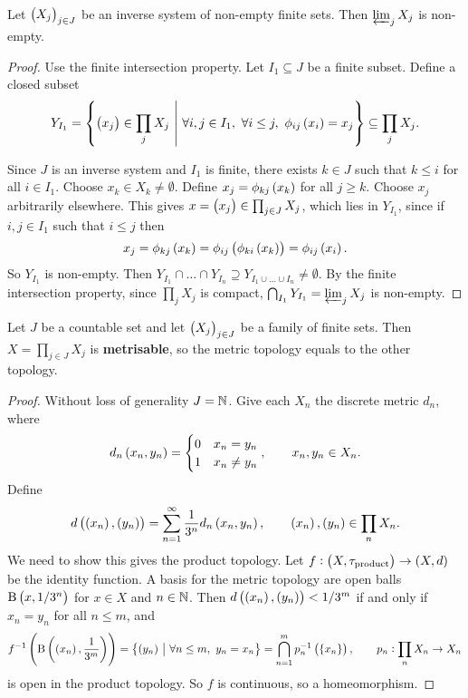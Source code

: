 \begin{proposition}
Let $ \br{X_j}_{j \in J} $ be an inverse system of non-empty finite sets. Then $ \varprojlim_j X_j $ is non-empty.
\end{proposition}

\begin{proof}
Use the finite intersection property. Let $ I_1 \subseteq J $ be a finite subset. Define a closed subset
$$ Y_{I_1} = \cbr{\br{x_j} \in \prod_j X_j \st \forall i, j \in I_1, \ \forall i \le j, \ \phi_{ij}\br{x_i} = x_j} \subseteq \prod_j X_j. $$

\pagebreak

Since $ J $ is an inverse system and $ I_1 $ is finite, there exists $ k \in J $ such that $ k \le i $ for all $ i \in I_1 $. Choose $ x_k \in X_k \ne \emptyset $. Define $ x_j = \phi_{kj}\br{x_k} $ for all $ j \ge k $. Choose $ x_j $ arbitrarily elsewhere. This gives $ x = \br{x_j} \in \prod_{j \in J} X_j $, which lies in $ Y_{I_1} $, since if $ i, j \in I_1 $ such that $ i \le j $ then
$$ x_j = \phi_{kj}\br{x_k} = \phi_{ij}\br{\phi_{ki}\br{x_k}} = \phi_{ij}\br{x_i}. $$
So $ Y_{I_1} $ is non-empty. Then $ Y_{I_1} \cap \dots \cap Y_{I_n} \supseteq Y_{I_1 \cup \dots \cup I_n} \ne \emptyset $. By the finite intersection property, since $ \prod_j X_j $ is compact, $ \bigcap_{I_1} Y_{I_1} = \varprojlim_j X_j $ is non-empty.
\end{proof}

\begin{proposition}
Let $ J $ be a countable set and let $ \br{X_j}_{j \in J} $ be a family of finite sets. Then $ X = \prod_{j \in J} X_j $ is \textbf{metrisable}, so the metric topology equals to the other topology.
\end{proposition}

\begin{proof}
Without loss of generality $ J = \mathbb{N} $. Give each $ X_n $ the discrete metric $ d_n $, where
$$ d_n\br{x_n, y_n} =
\begin{cases}
0 & x_n = y_n \\
1 & x_n \ne y_n
\end{cases},
\qquad x_n, y_n \in X_n. $$
Define
$$ d\br{\br{x_n}, \br{y_n}} = \sum_{n = 1}^\infty \dfrac{1}{3^n}d_n\br{x_n, y_n}, \qquad \br{x_n}, \br{y_n} \in \prod_n X_n. $$
We need to show this gives the product topology. Let $ f : \br{X, \tau_{\text{product}}} \to \br{X, d} $ be the identity function. A basis for the metric topology are open balls $ \B\br{x, 1 / 3^n} $ for $ x \in X $ and $ n \in \mathbb{N} $. Then $ d\br{\br{x_n}, \br{y_n}} < 1 / 3^m $ if and only if $ x_n = y_n $ for all $ n \le m $, and
$$ f^{-1}\br{\B\br{\br{x_n}, \dfrac{1}{3^m}}} = \cbr{\br{y_n} \st \forall n \le m, \ y_n = x_n} = \bigcap_{n = 1}^m p_n^{-1}\br{\cbr{x_n}}, \qquad p_n : \prod_n X_n \to X_n $$
is open in the product topology. So $ f $ is continuous, so a homeomorphism.
\end{proof}

